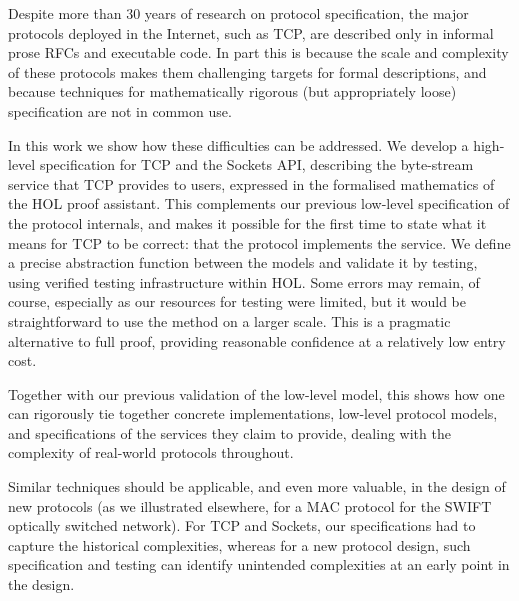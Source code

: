 Despite more than 30 years of research on protocol specification, the
major protocols deployed in the Internet, such as TCP, are described
only in informal prose RFCs and executable code.  In part this is
because the scale and complexity of these protocols makes them
challenging targets for formal descriptions, and because techniques
for mathematically rigorous (but appropriately loose) specification
are not in common use.

In this work we show how these difficulties can be addressed.  We
develop a high-level specification for TCP and the Sockets API,
describing the byte-stream service that TCP provides to users,
expressed in the formalised mathematics of the HOL proof assistant.
This complements our previous low-level specification of the protocol
internals, and makes it possible for the first time to state what it
means for TCP to be correct: that the protocol implements the service.
We define a precise abstraction function between the models and
validate it by testing, using verified testing infrastructure within
HOL. Some errors may remain, of course, especially as our resources
for testing were limited, but it would be straightforward to use the
method on a larger scale.  This is a pragmatic alternative to full
proof, providing reasonable confidence at a relatively low entry cost.

Together with our previous validation of the low-level model, this
shows how one can rigorously tie together concrete implementations,
low-level protocol models, and specifications of the services they
claim to provide, dealing with the complexity of real-world protocols
throughout.

Similar techniques should be applicable, and even more valuable, in
the design of new protocols (as we illustrated elsewhere, for a MAC
protocol for the SWIFT optically switched network).  For TCP and
Sockets, our specifications had to capture the historical
complexities, whereas for a new protocol design, such specification
and testing can identify unintended complexities at an early point in
the design.
